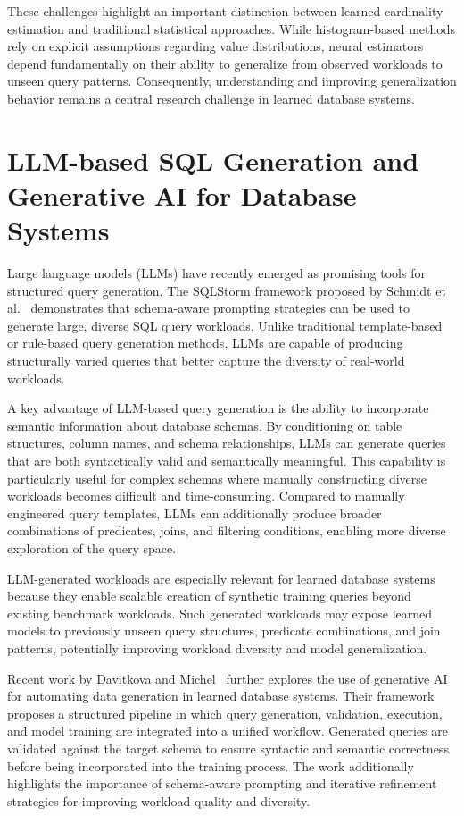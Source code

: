 These challenges highlight an important distinction between learned cardinality estimation and traditional statistical approaches. While histogram-based methods rely on explicit assumptions regarding value distributions, neural estimators depend fundamentally on their ability to generalize from observed workloads to unseen query patterns. Consequently, understanding and improving generalization behavior remains a central research challenge in learned database systems.

\section{LLM-based SQL Generation and Generative AI for Database Systems}

Large language models (LLMs) have recently emerged as promising tools for structured query generation. The SQLStorm framework proposed by Schmidt et al.~\cite{DBLP:journals/pvldb/SchmidtLBN25} demonstrates that schema-aware prompting strategies can be used to generate large, diverse SQL query workloads. Unlike traditional template-based or rule-based query generation methods, LLMs are capable of producing structurally varied queries that better capture the diversity of real-world workloads.

A key advantage of LLM-based query generation is the ability to incorporate semantic information about database schemas. By conditioning on table structures, column names, and schema relationships, LLMs can generate queries that are both syntactically valid and semantically meaningful. This capability is particularly useful for complex schemas where manually constructing diverse workloads becomes difficult and time-consuming. Compared to manually engineered query templates, LLMs can additionally produce broader combinations of predicates, joins, and filtering conditions, enabling more diverse exploration of the query space.

LLM-generated workloads are especially relevant for learned database systems because they enable scalable creation of synthetic training queries beyond existing benchmark workloads. Such generated workloads may expose learned models to previously unseen query structures, predicate combinations, and join patterns, potentially improving workload diversity and model generalization.

Recent work by Davitkova and Michel~\cite{DBLP:journals/corr/abs-2512-20271} further explores the use of generative AI for automating data generation in learned database systems. Their framework proposes a structured pipeline in which query generation, validation, execution, and model training are integrated into a unified workflow. Generated queries are validated against the target schema to ensure syntactic and semantic correctness before being incorporated into the training process. The work additionally highlights the importance of schema-aware prompting and iterative refinement strategies for improving workload quality and diversity.

